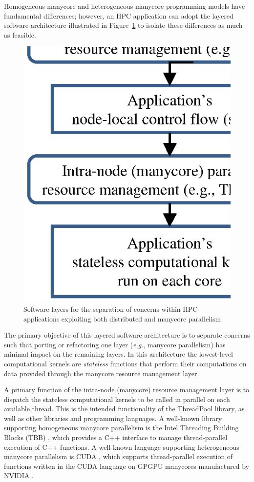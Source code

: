 Homogeneous manycore and heterogeneous manycore programming models have fundamental differences; however, an HPC application can adopt the layered software architecture illustrated in Figure~\ref{fig:HybridParallelArchitecture} to isolate these differences as much as feasible.
%
\begin{figure}[h]
\begin{center}
\includegraphics[viewport=0.5in 0.75in 3in 4.5in,angle=0,scale=1]{HybridParallelLayers.eps}
\caption{Software layers for the separation of concerns within HPC applications exploiting both distributed and manycore parallelism}
\label{fig:HybridParallelArchitecture}
\end{center}
\end{figure}
%
The primary objective of this layered software architecture is to separate concerns such that porting or refactoring one layer (\emph{e.g.}, manycore parallelism) has minimal impact on the remaining layers.
%
In this architecture the lowest-level computational kernels are \emph{stateless} functions that perform their computations on data provided through the manycore resource management layer.


A primary function of the intra-node (manycore) resource management layer is to dispatch the stateless computational kernels to be called in parallel on each available thread.
%
This is the intended functionality of the ThreadPool library, as well as other libraries and programming languages.
%
A well-known library supporting homogeneous manycore parallelism is the Intel Threading Building Blocks (TBB) \cite{TBB:Book}, which provides a C++ interface to manage thread-parallel execution of C++ functions.
%
A well-known language supporting heterogeneous manycore parallelism is 
CUDA \cite{CUDA:WebSite}, 
which supports thread-parallel execution of functions written in the CUDA language on GPGPU manycores manufactured by 
NVIDIA \cite{NVIDIA:Website}.


